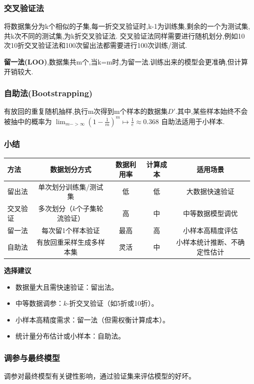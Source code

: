 \subsubsection{交叉验证法}
将数据集分为k个相似的子集,每一折交叉验证时,k-1为训练集,剩余的一个为测试集,共k次不同的测试集,为k折交叉验证法.
交叉验证法同样需要进行随机划分,例如10次10折交叉验证法和100次留出法都需要进行100次训练/测试.
\par \textbf{\heiti 留一法(LOO)},数据集共m个,当k=m时,为留一法.训练出来的模型会更准确,但计算开销较大.
\subsubsection{自助法(Bootstrapping)}
有放回的重复随机抽样,执行m次得到m个样本的数据集$D'$.其中,某些样本始终不会被抽中的概率为
$\lim_{m->\infty}(1-\frac{1}{m})^m\mapsto\frac{1}{e}\approx 0.368$
自助法适用于小样本.
\subsubsection{小结}
\begin{table}[ht]
\centering
\begin{tabular}{lcccc}
\toprule
\textbf{方法} & \textbf{数据划分方式} & \textbf{数据利用率} & \textbf{计算成本} & \textbf{适用场景} \\
\midrule
留出法 & 单次划分训练集/测试集 & 低 & 低 & 大数据快速验证 \\
交叉验证 & 多次划分（\(k\)个子集轮流验证） & 高 & 中 & 中等数据模型调优 \\
留一法 & 每次留1个样本验证 & 最高 & 高 & 小样本高精度评估 \\
自助法 & 有放回重采样生成多样本集 & 灵活 & 中 & 小样本统计推断、不确定性估计 \\
\bottomrule
\end{tabular}
\end{table}

\textbf{\heiti 选择建议}
\begin{itemize}[noitemsep]
    \item 数据量大且需快速验证：留出法。
    \item 中等数据调参：\(k\)-折交叉验证（如5折或10折）。
    \item 小样本高精度需求：留一法（但需权衡计算成本）。
    \item 统计量分布估计或小样本：自助法。
\end{itemize}
\subsubsection{调参与最终模型}
调参对最终模型有关键性影响，通过验证集来评估模型的好坏。
\newpage
